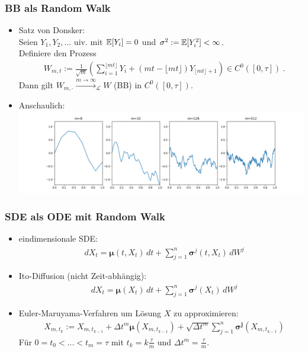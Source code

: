\begin{frame}
	\frametitle{BB als Random Walk}
	\begin{itemize}
		\item Satz von Donsker:\\
		Seien $Y_1,Y_2,...$ uiv. mit $\mathbb{E}[Y_i]=0$ und $\sigma^2 := \mathbb{E}[Y_i^2] < \infty$.\\
		Definiere den Prozess
		\begin{align*}
		& W_{m,t} := \frac{1}{\sqrt{m}} \left( \sum\limits_{i=1}^{\lfloor mt \rfloor} Y_i + (mt - \lfloor mt \rfloor) Y_{\lfloor mt \rfloor +1}\right) \in C^0([0,\tau]) \ .
		\end{align*}
		Dann gilt $W_{m,\cdot} \xrightarrow{m \rightarrow \infty}_{\mathcal{L}} W$ (BB) in $C^0([0,\tau])$.
		
		\item Anschaulich:\\
		\includegraphics[scale=0.25]{Ben/DonskerBilder.png}
	\end{itemize}
	
\end{frame}


\begin{frame}
	\frametitle{SDE als ODE mit Random Walk}
	\begin{itemize}
		\item eindimensionale SDE:
		\begin{align*}
		& dX_t = \bm{\mu}(t,X_t) \, dt + \sum\limits_{j=1}^n \bm{\sigma}^{j}(t,X_t) \, dW^j
		\end{align*}
		\item Ito-Diffusion (nicht Zeit-abhängig):
		\begin{align*}
		& dX_t = \bm{\mu}(X_t) \, dt + \sum\limits_{j=1}^n \bm{\sigma}^{j}(X_t) \, dW^j
		\end{align*}
		\item Euler-Maruyama-Verfahren um Lösung $X$ zu approximieren:
		\begin{align*}
		& X_{m,t_k} := X_{m,t_{k-1}} + \Delta t^m \bm{\mu}(X_{m,t_{k-1}}) + \sqrt{\Delta t^m} \sum\limits_{j=1}^n \bm{\sigma^j}(X_{m,t_{k-1}})
		\end{align*}
		Für $0=t_0<...<t_m=\tau$ mit $t_k = k \frac{\tau}{m}$ und $\Delta t^m = \frac{\tau}{m}$.
	\end{itemize}
	
\end{frame}


